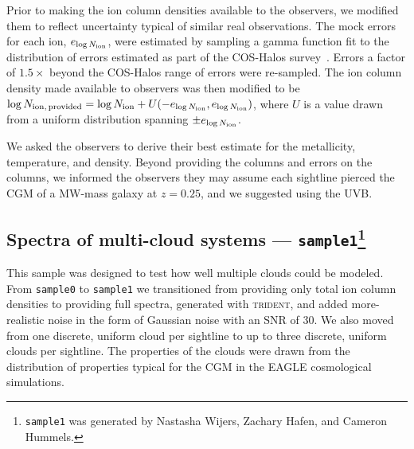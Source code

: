 \documentclass[fleqn,usenatbib]{mnras}
\begin{document}
Prior to making the ion column densities available to the observers, we modified them to reflect uncertainty typical of similar real observations.
The mock errors for each ion, $e_{\log N_{\rm ion}}$, were estimated by sampling a gamma function fit to the distribution of errors estimated as part of the COS-Halos survey~\citep{werk2013COSHALOS}.
Errors a factor of $1.5\times$ beyond the COS-Halos range of errors were re-sampled.
The ion column density made available to observers was then modified to be $\log N_{\rm ion,\,provided} = \log N_{\rm ion} + U(-e_{\log N_{\rm ion}}, e_{\log N_{\rm ion}} )$, where $U$ is a value drawn from a uniform distribution spanning $\pm e_{\log N_{\rm ion}}$.

We asked the observers to derive their best estimate for the metallicity, temperature, and density.
Beyond providing the columns and errors on the columns, we informed the observers they may assume each sightline pierced the CGM of a MW-mass galaxy at $z=0.25$, and we suggested using the \cite{haardt2012RADIATIVE} UVB.

\subsection[Spectra of multi-cloud systems --- \texttt{sample1}]{Spectra of multi-cloud systems --- \texttt{sample1}\footnote{
\texttt{sample1} was generated by Nastasha Wijers, Zachary Hafen, and Cameron Hummels.
}}
\label{s: data generation -- sample1}

This sample was designed to test how well multiple clouds could be modeled.
From \texttt{sample0} to \texttt{sample1} we transitioned from providing only total ion column densities to providing full spectra, generated with \textsc{trident}, and added more-realistic noise in the form of Gaussian noise with an SNR of 30.
We also moved from one discrete, uniform cloud per sightline to up to three discrete, uniform clouds per sightline.
The properties of the clouds were drawn from the distribution of properties typical for the CGM in the \textsc{EAGLE} cosmological simulations.
\end{document}
